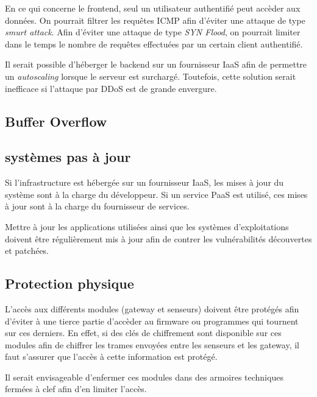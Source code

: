 \documentclass[12pt]{article}
\begin{document}
En ce qui concerne le frontend, seul un utilisateur authentifié peut accèder aux données. On pourrait filtrer les requêtes ICMP afin d'éviter une attaque de type \textit{smurt attack}. Afin d'éviter une attaque de type \textit{SYN Flood}, on pourrait limiter dans le temps le nombre de requêtes effectuées par un certain client authentifié.

Il serait possible d'héberger le backend sur un fournisseur IaaS afin de permettre un \textit{autoscaling} lorsque le serveur est surchargé. Toutefois, cette solution serait inefficace si l'attaque par DDoS est de grande envergure.

\subsection{Buffer Overflow}

\subsection{systèmes pas à jour}
Si l'infrastructure est hébergée sur un fournisseur IaaS, les mises à jour du système sont à la charge du développeur. Si un service PaaS est utilisé, ces mises à jour sont à la charge du fournisseur de services.

Mettre à jour les applications utilisées ainsi que les systèmes d'exploitations doivent être régulièrement mis à jour afin de contrer les vulnérabilités découvertes et patchées.

\subsection{Protection physique}
L'accès aux différents modules (gateway et senseurs) doivent être protégés afin d'éviter à une tierce partie d'accèder au firmware ou programmes qui tournent sur ces derniers. En effet, si des clés de chiffrement sont disponible sur ces modules afin de chiffrer les trames envoyées entre les senseurs et les gateway, il faut s'assurer que l'accès à cette information est protégé.

Il serait envisageable d'enfermer ces modules dans des armoires techniques fermées à clef afin d'en limiter l'accès.
\end{document}
